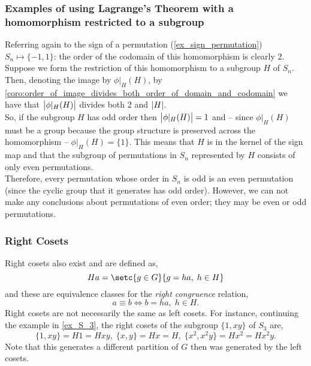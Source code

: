 \documentclass[MathsNotesBase.tex]{subfiles}
\begin{document}
{	\subsubsection{Examples of using Lagrange's Theorem with a homomorphism restricted to a subgroup}
	\begin{exe}
		\item{Referring again to the sign of a permutation (\ref{ex_sign_permutation}) ${ S_n \longmapsto \{-1,1\} }$: the order of the codomain of this homomorphism is clearly 2. Suppose we form the restriction of this homomorphism to a subgroup $H$ of $S_n$. Then, denoting the image by $\phi\vert_H(H)$, by \autoref{coro:order_of_image_divides_both_order_of_domain_and_codomain} we have that ${ \left\lvert\phi\vert_H(H)\right\rvert }$ divides both 2 and ${ \left\lvert H\right\rvert }$.\\
		So, if the subgroup $H$ has odd order then ${ \left\lvert\phi\vert_H(H)\right\rvert = 1 }$ and -- since $\phi\vert_H(H)$ must be a group because the group structure is preserved across the homomorphism --  ${ \phi\vert_H(H) = \{1\} }$. This means that $H$ is in the kernel of the sign map and that the subgroup of permutations in $S_n$ represented by $H$ consists of only even permutations.\\
		Therefore, every permutation whose order in $S_n$ is odd is an even permutation (since the cyclic group that it generates has odd order). However, we can not make any conclusions about permutations of even order; they may be even or odd permutations.
		}
	\end{exe}

	\bigskip
	\subsubsection{Right Cosets}
	Right cosets also exist and are defined as,
 \[ Ha = \setc{g \in G}{g = ha, \; h \in H} \]
	and these are equivalence classes for the \textit{right congruence} relation,
	\[ a \equiv b \iff b = ha, \; h \in H. \]
	Right cosets are not necessarily the same as left cosets. For instance, continuing the example in \ref{ex_S_3}, the right cosets of the subgroup $\{1, xy\}$ of $S_3$ are,
	\[ \{1, xy\} = H1 = Hxy, \; \{x, y\} = Hx = H, \; \{x^2, x^2y\} = Hx^2 = Hx^2y. \]
	Note that this generates a different partition of $G$ then was generated by the left cosets.
}
\end{document}

